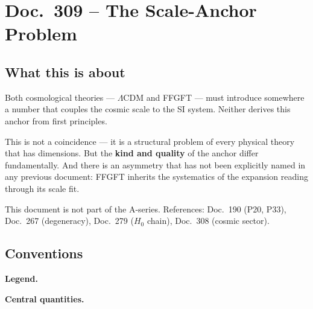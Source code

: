 \maketitle
\tableofcontents

\chapter*{Doc.~309 -- The Scale-Anchor Problem}


\section*{What this is about}

Both cosmological theories — $\Lambda$CDM and FFGFT — must introduce
somewhere a number that couples the cosmic scale to the SI system.
Neither derives this anchor from first principles.

This is not a coincidence — it is a structural problem of every physical
theory that has dimensions. But the \textbf{kind and quality} of the
anchor differ fundamentally. And there is an asymmetry that has not been
explicitly named in any previous document: FFGFT inherits the systematics
of the expansion reading through its scale fit.

This document is not part of the A-series.
References: Doc.~190 (P20, P33), Doc.~267 (degeneracy),
Doc.~279 ($H_0$ chain), Doc.~308 (cosmic sector).

\section*{Conventions}

\noindent\textbf{Legend.}

\medskip


\medskip
\noindent\textbf{Central quantities.}

